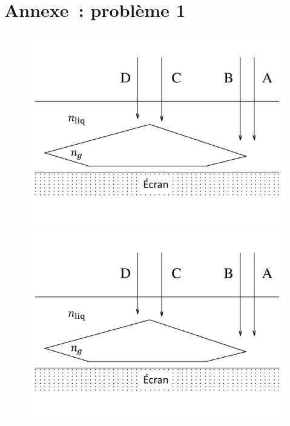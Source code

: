 \documentclass[a4paper, 10pt, garamond, oneside]{book}
\begin{document}
{	\newpage
	\chapter*{Annexe~: problème 1}
	\begin{figure}[htbp]
		\centering
		{\includegraphics[width=.7\linewidth]{gemme_e}}
		{\includegraphics[width=.7\linewidth]{gemme_e}}
		\caption{}
	\end{figure}

	\newpage
}
\end{document}
